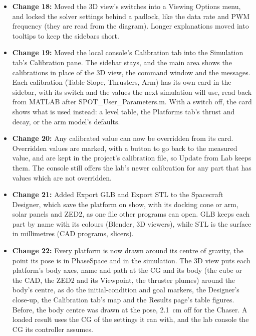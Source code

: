 \documentclass[11pt]{article}
\begin{document}
\begin{itemize}[label={\textcolor{primaryColor}{\textbullet}}]
    \item \textbf{Change 18:} Moved the 3D view's switches into a Viewing Options menu, and locked the solver settings behind a padlock, like the data rate and PWM frequency (they are read from the diagram). Longer explanations moved into tooltips to keep the sidebars short.
    \item \textbf{Change 19:} Moved the local console's Calibration tab into the Simulation tab's Calibration pane. The sidebar stays, and the main area shows the calibrations in place of the 3D view, the command window and the messages. Each calibration (Table Slope, Thrusters, Arm) has its own card in the sidebar, with its switch and the values the next simulation will use, read back from MATLAB after SPOT\_User\_Parameters.m. With a switch off, the card shows what is used instead: a level table, the Platforms tab's thrust and decay, or the arm model's defaults.
    \item \textbf{Change 20:} Any calibrated value can now be overridden from its card. Overridden values are marked, with a button to go back to the measured value, and are kept in the project's calibration file, so Update from Lab keeps them. The console still offers the lab's newer calibration for any part that has values which are not overridden.
    \item \textbf{Change 21:} Added Export GLB and Export STL to the Spacecraft Designer, which save the platform on show, with its docking cone or arm, solar panels and ZED2, as one file other programs can open. GLB keeps each part by name with its colours (Blender, 3D viewers), while STL is the surface in millimetres (CAD programs, slicers).
    \item \textbf{Change 22:} Every platform is now drawn around its centre of gravity, the point its pose is in PhaseSpace and in the simulation. The 3D view puts each platform's body axes, name and path at the CG and its body (the cube or the CAD, the ZED2 and its Viewpoint, the thruster plumes) around the body's centre, as do the initial-condition and goal markers, the Designer's close-up, the Calibration tab's map and the Results page's table figures. Before, the body centre was drawn at the pose, 2.1~cm off for the Chaser. A loaded result uses the CG of the settings it ran with, and the lab console the CG its controller assumes.

\end{itemize}
\end{document}
